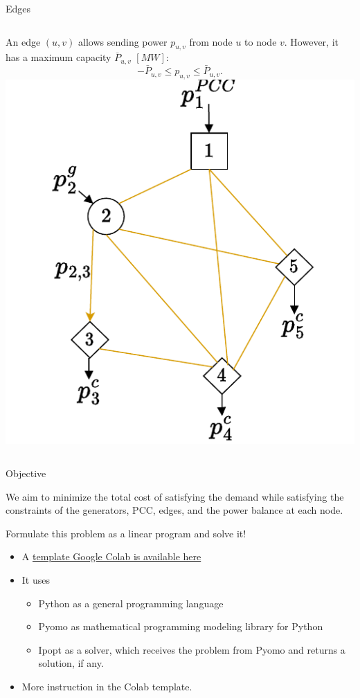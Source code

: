 \begin{frame}{Edges}
\begin{columns}
An edge $(u,v)$ allows sending power $p_{u,v}$ from node $u$ to node $v$.
However, it has a maximum capacity $\bar{P}_{u,v}$ $[MW]$: 
$$-\bar{P}_{u,v}\leq p_{u,v} \leq \bar{P}_{u,v}.$$
\includegraphics[width=\textwidth]{images/netwok_flow-Page-6_drawio.pdf}
\end{columns}
\end{frame}

\begin{frame}{Objective}

We aim to minimize the total cost of satisfying the demand while satisfying the constraints of the generators, PCC, edges, and the power balance at each node. 
    
\end{frame}

\begin{frame}{Formulate this problem as a linear program and solve it!}

\begin{itemize}
    \item A \alert{\href{https://colab.research.google.com/drive/1lrWL7sOrazTzlapVxcxrv_ZvVUZADC0h?usp=sharing}{template Google Colab is available here}}
    \item It uses 
    \begin{itemize}
        \item Python as a general programming language
        \item Pyomo as mathematical programming modeling library for Python
        \item Ipopt as a solver, which receives the problem from Pyomo and returns a solution, if any.
    \end{itemize}
    \item More instruction in the Colab template.
\end{itemize}
\end{frame}
